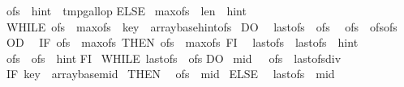 \begin{isabellebody}
\ {\isasymacute}ofs\ {\isacharcolon}{\isacharequal}{\isacharequal}\ {\isasymacute}hint\ {\isacharminus}\ {\isasymacute}tmp{\isacharunderscore}gallop\isanewline
ELSE\isanewline
\ {\isasymacute}max{\isacharunderscore}ofs\ {\isacharcolon}{\isacharequal}{\isacharequal}\ {\isasymacute}len\ {\isacharminus}\ {\isasymacute}hint{\isacharsemicolon}{\isacharsemicolon}\isanewline
\ WHILE\ {\isacharparenleft}{\isasymacute}ofs\ {\isacharless}\ {\isasymacute}max{\isacharunderscore}ofs\ {\isacharampersand}\ {\isasymacute}key\ {\isasymge}\ {\isasymacute}array{\isacharbang}{\isacharparenleft}{\isasymacute}base{\isacharplus}{\isasymacute}hint{\isacharplus}{\isasymacute}ofs{\isacharparenright}{\isacharparenright}\isanewline
\ DO\isanewline
\ \ {\isasymacute}last{\isacharunderscore}ofs\ {\isacharcolon}{\isacharequal}{\isacharequal}\ {\isasymacute}ofs{\isacharsemicolon}{\isacharsemicolon}\isanewline
\ \ {\isasymacute}ofs\ {\isacharcolon}{\isacharequal}{\isacharequal}\ {\isasymacute}ofs{\isacharplus}{\isasymacute}ofs{\isacharplus}{}\isanewline
\ OD\ {\isacharsemicolon}{\isacharsemicolon}\isanewline
\ IF\ {\isasymacute}ofs\ {\isachargreater}\ {\isasymacute}max{\isacharunderscore}ofs\ THEN\ {\isasymacute}ofs\ {\isacharcolon}{\isacharequal}{\isacharequal}\ {\isasymacute}max{\isacharunderscore}ofs\ FI\ {\isacharsemicolon}{\isacharsemicolon}\isanewline
\ {\isasymacute}last{\isacharunderscore}ofs\ {\isacharcolon}{\isacharequal}{\isacharequal}\ {\isasymacute}last{\isacharunderscore}ofs\ {\isacharplus}\ {\isasymacute}hint{\isacharplus}{}{\isacharsemicolon}{\isacharsemicolon}\isanewline
\ {\isasymacute}ofs\ {\isacharcolon}{\isacharequal}{\isacharequal}\ {\isasymacute}ofs\ {\isacharplus}\ {\isasymacute}hint\isanewline
FI\ {\isacharsemicolon}{\isacharsemicolon}\isanewline
WHILE\ {\isacharparenleft}{\isasymacute}last{\isacharunderscore}ofs\ {\isacharless}\ {\isasymacute}ofs{\isacharparenright}\isanewline
DO\isanewline
\ {\isasymacute}mid\ {\isacharcolon}{\isacharequal}{\isacharequal}\ \ {\isacharparenleft}{\isasymacute}ofs\ {\isacharplus}\ {\isasymacute}last{\isacharunderscore}ofs{\isacharparenright}div\ {}{\isacharsemicolon}{\isacharsemicolon}\isanewline
\ IF\ {\isacharparenleft}{\isasymacute}key\ {\isacharless}\ {\isasymacute}array{\isacharbang}{\isacharparenleft}{\isasymacute}base{\isacharplus}{\isasymacute}mid{\isacharparenright}{\isacharparenright}\isanewline
\ THEN\isanewline
\ \ {\isasymacute}ofs\ {\isacharcolon}{\isacharequal}{\isacharequal}\ {\isasymacute}mid\isanewline
\ ELSE\isanewline
\ \ {\isasymacute}last{\isacharunderscore}ofs\ {\isacharcolon}{\isacharequal}{\isacharequal}\ {\isasymacute}mid{\isacharplus}{}\isanewline

\end{isabellebody}

